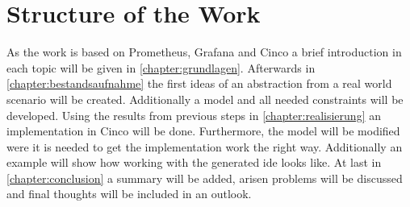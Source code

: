 \section{Structure of the Work}
As the work is based on Prometheus, Grafana and Cinco a brief introduction in each topic will be given in \cref{chapter:grundlagen}. Afterwards in \cref{chapter:bestandsaufnahme} the first ideas of an abstraction from a real world scenario will be created. Additionally a model and all needed constraints will be developed. Using the results from previous steps in \cref{chapter:realisierung} an implementation in Cinco will be done. Furthermore, the model will be modified were it is needed to get the implementation work the right way. Additionally an example will show how working with the generated \gls{ide} looks like. At last in \cref{chapter:conclusion} a summary will be added, arisen problems will be discussed and final thoughts will be included in an outlook.